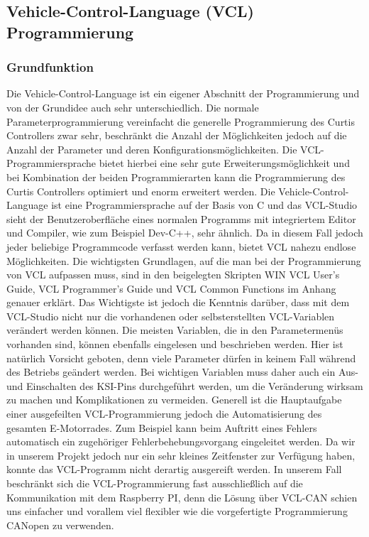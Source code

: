 \subsection{Vehicle-Control-Language (VCL) Programmierung}
\subsubsection{Grundfunktion}
Die Vehicle-Control-Language ist ein eigener Abschnitt der Programmierung und von der Grundidee auch sehr unterschiedlich. Die normale Parameterprogrammierung vereinfacht die generelle Programmierung des Curtis Controllers zwar sehr, beschränkt die Anzahl der Möglichkeiten jedoch auf die Anzahl der Parameter und deren Konfigurationsmöglichkeiten. Die VCL-Programmiersprache bietet hierbei eine sehr gute Erweiterungsmöglichkeit und bei Kombination der beiden Programmierarten kann die Programmierung des Curtis Controllers optimiert und enorm erweitert werden. Die Vehicle-Control-Language ist eine Programmiersprache auf der Basis von C und das VCL-Studio sieht der Benutzeroberfläche eines normalen Programms mit integriertem Editor und Compiler, wie zum Beispiel Dev-C++, sehr ähnlich. Da in diesem Fall jedoch jeder beliebige Programmcode verfasst werden kann, bietet VCL nahezu endlose Möglichkeiten. Die wichtigsten Grundlagen, auf die man bei der Programmierung von VCL aufpassen muss, sind in den beigelegten Skripten \glqq WIN VCL User's Guide\grqq{}, \glqq VCL Programmer's Guide\grqq{} und \glqq VCL Common Functions\grqq{} im Anhang genauer erklärt. Das Wichtigste ist jedoch die Kenntnis darüber, dass mit dem VCL-Studio nicht nur die vorhandenen oder selbsterstellten VCL-Variablen verändert werden können. Die meisten Variablen, die in den Parametermenüs vorhanden sind, können ebenfalls eingelesen und beschrieben werden. Hier ist natürlich Vorsicht geboten, denn viele Parameter dürfen in keinem Fall während des Betriebs geändert werden. Bei wichtigen Variablen muss daher auch ein Aus- und Einschalten des KSI-Pins durchgeführt werden, um die Veränderung wirksam zu machen und Komplikationen zu vermeiden. Generell ist die Hauptaufgabe einer ausgefeilten VCL-Programmierung jedoch die Automatisierung des gesamten E-Motorrades. Zum Beispiel kann beim Auftritt eines Fehlers automatisch ein zugehöriger Fehlerbehebungsvorgang eingeleitet werden. Da wir in unserem Projekt jedoch nur ein sehr kleines Zeitfenster zur Verfügung haben, konnte das VCL-Programm nicht derartig ausgereift werden. In unserem Fall beschränkt sich die VCL-Programmierung fast ausschließlich auf die Kommunikation mit dem Raspberry PI, denn die Lösung über VCL-CAN schien uns einfacher und vorallem viel flexibler wie die vorgefertigte Programmierung \glqq CANopen\grqq{} zu verwenden. 


